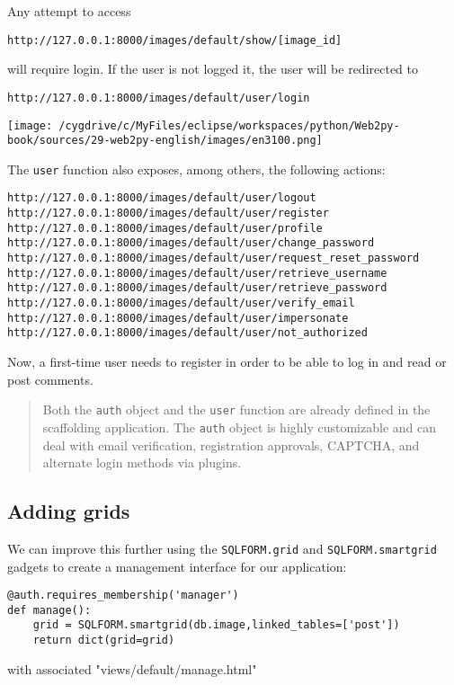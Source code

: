 \documentclass[justified,sixbynine,notoc]{tufte-book}
\def\ft{\small\tt}
\begin{document}
\begin{fullwidth}
Any attempt to access
\begin{lstlisting}[keywords={}]
http://127.0.0.1:8000/images/default/show/[image_id]
\end{lstlisting}
\noindent will require login. If the user is not logged it, the user will be redirected to
\begin{lstlisting}[keywords={}]
http://127.0.0.1:8000/images/default/user/login
\end{lstlisting}


\goodbreak\begin{center}\texttt{[image: /cygdrive/c/MyFiles/eclipse/workspaces/python/Web2py-book/sources/29-web2py-english/images/en3100.png]}\end{center}


The {\ft user} function also exposes, among others, the following actions:
\begin{lstlisting}[keywords={}]
http://127.0.0.1:8000/images/default/user/logout
http://127.0.0.1:8000/images/default/user/register
http://127.0.0.1:8000/images/default/user/profile
http://127.0.0.1:8000/images/default/user/change_password
http://127.0.0.1:8000/images/default/user/request_reset_password
http://127.0.0.1:8000/images/default/user/retrieve_username
http://127.0.0.1:8000/images/default/user/retrieve_password
http://127.0.0.1:8000/images/default/user/verify_email
http://127.0.0.1:8000/images/default/user/impersonate
http://127.0.0.1:8000/images/default/user/not_authorized
\end{lstlisting}

Now, a first-time user needs to register in order to be able to log in and read or post comments.

\begin{quote}Both the {\ft auth} object and the {\ft user} function are already defined in the scaffolding application. The {\ft auth} object is highly customizable and can deal with email verification, registration approvals, CAPTCHA, and alternate login methods via plugins.\end{quote}
\goodbreak\subsection{Adding grids}

We can improve this further using the {\ft SQLFORM.grid} and {\ft SQLFORM.smartgrid} gadgets to create a management interface for our application:

\begin{lstlisting}
@auth.requires_membership('manager')
def manage():
    grid = SQLFORM.smartgrid(db.image,linked_tables=['post'])
    return dict(grid=grid)
\end{lstlisting}
\noindent with associated "views/default/manage.html"


\end{fullwidth}
\end{document}
